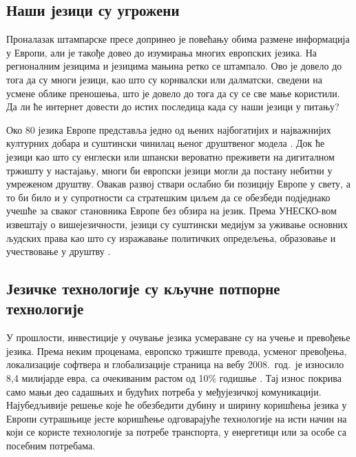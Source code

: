 \begin{multicols}{2}
\subsection {Наши језици су угрожени}
  
Проналазак штампарске пресе допринео је повећању обима размене информација у Европи, али је такође довео до изумирања многих европских језика. На регионалним језицима и језицима мањина ретко се штампало. Ово је довело до тога да су многи језици, као што су корнвалски или далматски, сведени на усмене облике преношења, што је довело до тога да су се све мање користили.  Да ли ће интернет довести до истих последица када су наши језици у питању?


Око 80 језика Европе представља једно од њених најбогатијих и најважнијих културних добара и суштински чинилац њеног друштвеног модела \cite{EC2}. Док ће језици као што су енглески или шпански вероватно преживети на дигиталном тржишту у настајању, многи би европски језици могли да постану небитни у умреженом друштву. Овакав развој ствари ослабио би позицију Европе у свету, а то би било и у супротности са стратешким циљем да се обезбеди подједнако учешће за сваког становника Европе без обзира на језик. Према УНЕСКО-вом извештају о вишејезичности, језици су суштински медијум за уживање основних људских права као што су изражавање политичких опредељења, образовање и учествовање у друштву \cite{Unesco1}.


\subsection {Језичке технологије су кључне потпорне технологије}
  
У прошлости, инвестиције у очување језика усмераване су на учење и превођење језика. Према неким проценама, европско тржиште превода, усменог превођења, локализације софтвера и глобализације страница на вебу  2008.~год.~је износило 8,4 милијарде евра, са очекиваним растом од 10\% годишње \cite{EC3}. Тај износ покрива само мањи део садашњих и будућих потреба у међујезичкој комуникацији. Најубедљивије решење које ће обезбедити дубину и ширину коришћења језика у Европи сутрашњице јесте коришћење одговарајуће технологије на исти начин на који се користе технологије за потребе транспорта, у енергетици или за особе са посебним потребама. 


\end{multicols}
